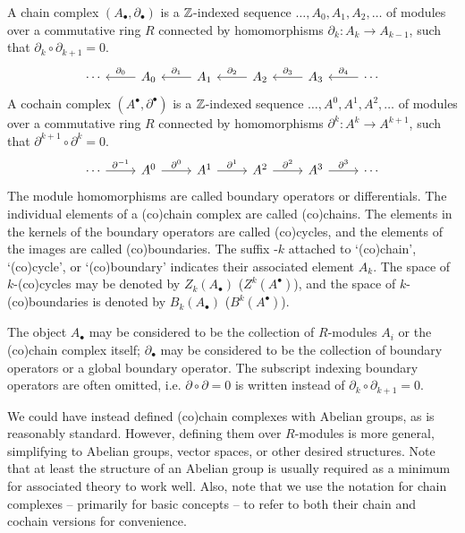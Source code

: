 \documentclass[a4paper,12pt]{article}
\begin{document}
\begin{definition}\label{def:(co)chain_complex}
    A chain complex $(A_\bullet, \partial_\bullet)$ is a $\mathbb{Z}$-indexed sequence $\ldots, A_0, A_1, A_2, \ldots$ of modules over a commutative ring $R$ connected by homomorphisms $\partial_k \colon A_k \to A_{k-1}$, such that $\partial_k \circ \partial_{k+1} = 0$.
    \[\begin{tikzcd}
	\cdots & {A_0} & {A_1} & {A_2} & {A_3} & \cdots
	\arrow["{\partial_0}"', from=1-2, to=1-1]
	\arrow["{\partial_1}"', from=1-3, to=1-2]
	\arrow["{\partial_2}"', from=1-4, to=1-3]
	\arrow["{\partial_3}"', from=1-5, to=1-4]
	\arrow["{\partial_4}"', from=1-6, to=1-5]
    \end{tikzcd}\]
    A cochain complex $(A^\bullet, \partial^\bullet)$ is a $\mathbb{Z}$-indexed sequence $\ldots, A^0, A^1, A^2, \ldots$ of modules over a commutative ring $R$ connected by homomorphisms $\partial^k \colon A^k \to A^{k+1}$, such that $\partial^{k+1} \circ \partial^k = 0$.
    \[\begin{tikzcd}
	\cdots & {A^0} & {A^1} & {A^2} & {A^3} & \cdots
	\arrow["{\partial^{-1}}", from=1-1, to=1-2]
	\arrow["{\partial^0}", from=1-2, to=1-3]
	\arrow["{\partial^1}", from=1-3, to=1-4]
	\arrow["{\partial^2}", from=1-4, to=1-5]
	\arrow["{\partial^3}", from=1-5, to=1-6]
    \end{tikzcd}\]
    The module homomorphisms are called boundary operators or differentials.
    The individual elements of a (co)chain complex are called (co)chains.
    The elements in the kernels of the boundary operators are called (co)cycles, and the elements of the images are called (co)boundaries.
    The suffix -$k$ attached to \enquote*{(co)chain}, \enquote*{(co)cycle}, or \enquote*{(co)boundary} indicates their associated element $A_k$.
    The space of $k$-(co)cycles may be denoted by $Z_k(A_\bullet)$ ($Z^k(A^\bullet)$), and the space of $k$-(co)boundaries is denoted by $B_k(A_\bullet)$ ($B^k(A^\bullet)$).

    The object $A_\bullet$ may be considered to be the collection of $R$-modules $A_i$ or the (co)chain complex itself; $\partial_\bullet$ may be considered to be the collection of boundary operators or a global boundary operator.
    The subscript indexing boundary operators are often omitted, i.e. $\partial \circ \partial = 0$ is written instead of $\partial_k \circ \partial_{k+1} = 0$.
\end{definition}
\begin{remark}
    We could have instead defined (co)chain complexes with Abelian groups, as is reasonably standard.
    However, defining them over $R$-modules is more general, simplifying to Abelian groups, vector spaces, or other desired structures.
    Note that at least the structure of an Abelian group is usually required as a minimum for associated theory to work well.
    Also, note that we use the notation for chain complexes -- primarily for basic concepts -- to refer to both their chain and cochain versions for convenience.
\end{remark}
\end{document}
